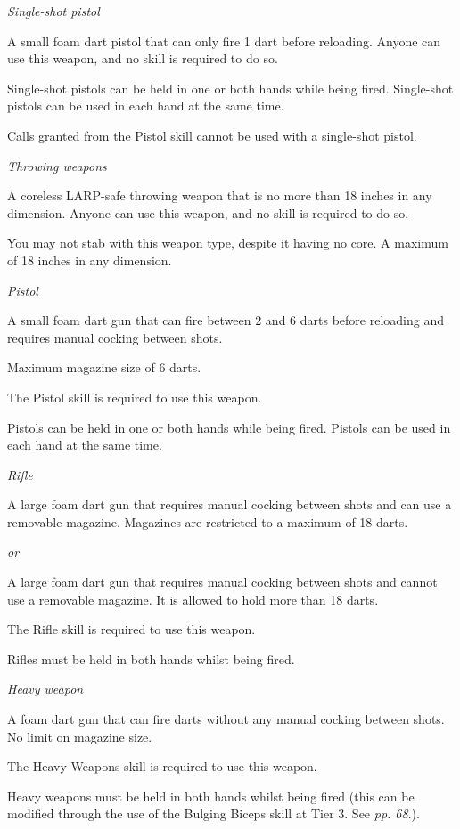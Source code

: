 \documentclass{scrbook}
\begin{document}
\textit{Single-shot pistol}

A small foam dart pistol that can only fire 1 dart before reloading. Anyone can use this weapon, and no skill is required to do so.

Single-shot pistols can be held in one or both hands while being fired. Single-shot pistols can be used in each hand at the same time.

Calls granted from the Pistol skill cannot be used with a single-shot pistol.

\textit{Throwing weapons}

A coreless LARP-safe throwing weapon that is no more than 18 inches in any dimension. Anyone can use this weapon, and no skill is required to do so.

You may not stab with this weapon type, despite it having no core. A maximum of 18 inches in any dimension.

\textit{Pistol}

A small foam dart gun that can fire between 2 and 6 darts before reloading and requires manual cocking between shots.

Maximum magazine size of 6 darts.

The Pistol skill is required to use this weapon.

Pistols can be held in one or both hands while being fired. Pistols can be used in each hand at the same time.

\textit{Rifle}

A large foam dart gun that requires manual cocking between shots and can use a removable magazine. Magazines are restricted to a maximum of 18 darts.

\textit{or}

A large foam dart gun that requires manual cocking between shots and cannot use a removable magazine. It is allowed to hold more than 18 darts.

The Rifle skill is required to use this weapon.

Rifles must be held in both hands whilst being fired.

\textit{Heavy weapon}

A foam dart gun that can fire darts without any manual cocking between shots. No limit on magazine size.

The Heavy Weapons skill is required to use this weapon.

Heavy weapons must be held in both hands whilst being fired (this can be modified through the use of the Bulging Biceps skill at Tier 3. See \textit{pp. 68}.).
\end{document}
